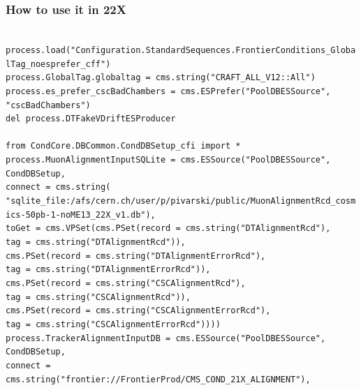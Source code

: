 \documentclass[compress]{beamer}
\begin{document}
\begin{frame}
\frametitle{How to use it in 22X}
\tiny \tt
process.load("Configuration.StandardSequences.FrontierConditions\_GlobalTag\_noesprefer\_cff") \\
process.GlobalTag.globaltag = cms.string("CRAFT\_ALL\_V12::All") \\
process.es\_prefer\_cscBadChambers = cms.ESPrefer("PoolDBESSource", "cscBadChambers") \\
del process.DTFakeVDriftESProducer \\
\mbox{ } \\
from CondCore.DBCommon.CondDBSetup\_cfi import * \\
process.MuonAlignmentInputSQLite = cms.ESSource("PoolDBESSource", \\
\hspace{1 cm}CondDBSetup, \\
\hspace{1 cm}connect = cms.string( \\
"sqlite\_file:/afs/cern.ch/user/p/pivarski/public/MuonAlignmentRcd\_cosmics-50pb-1-noME13\_22X\_v1.db"), \\
\hspace{1.5 cm}toGet = cms.VPSet(cms.PSet(record = cms.string("DTAlignmentRcd"), \\
\hspace{2.5 cm}tag = cms.string("DTAlignmentRcd")), \\
\hspace{2 cm}cms.PSet(record = cms.string("DTAlignmentErrorRcd"), \\
\hspace{2.5 cm}tag = cms.string("DTAlignmentErrorRcd")), \\
\hspace{2 cm}cms.PSet(record = cms.string("CSCAlignmentRcd"), \\
\hspace{2.5 cm}tag = cms.string("CSCAlignmentRcd")), \\
\hspace{2 cm}cms.PSet(record = cms.string("CSCAlignmentErrorRcd"), \\
\hspace{2.5 cm}tag = cms.string("CSCAlignmentErrorRcd")))) \\
process.TrackerAlignmentInputDB = cms.ESSource("PoolDBESSource", \\
\hspace{1 cm}CondDBSetup, \\
\hspace{1 cm}connect = cms.string("frontier://FrontierProd/CMS\_COND\_21X\_ALIGNMENT"), \\

\end{frame}
\end{document}
